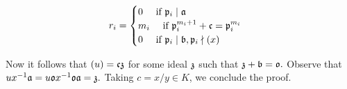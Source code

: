 \documentclass{article}
\theoremstyle{definition}
\theoremstyle{remark}
\begin{document}
\begin{enumerate}
        $$r_i = \begin{cases}
          0 \quad \text{ if } \mathfrak{p}_i \mid \mathfrak{a} \\
          m_i \quad \text{ if } \mathfrak{p}_i^{m_i + 1} + \mathfrak{c} = \mathfrak{p}_i^{m_i}\\
          0 \quad \text{ if } \mathfrak{p}_i \mid \mathfrak{b}, \mathfrak{p}_i \nmid (x)
                \end{cases}
          $$

        \newcommand{\iz}{\I z}
        Now it follows that $(u) = \ic \iz$ for some ideal $\iz$ such that $\iz + \ib = \io.$ Observe that $ux^{-1}\ia = u\io x^{-1}\io \ia = \iz.$ Taking $c = x/y \in K$, we conclude the proof.
\end{enumerate}
\end{document}

